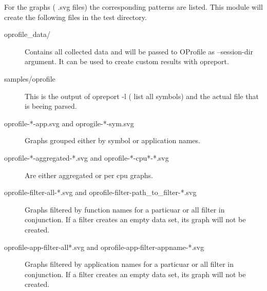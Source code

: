     For the graphs ( .svg files) the corresponding patterns are listed.
    This module will create the following files in the test directory.
    \begin{description}
        \item[oprofile\_data/]
            Contains all collected data and will be passed to OProfile
            as --session-dir argument. It can be used to create custom
            results with opreport.

        \item[samples/oprofile]
            This is the output of opreport -l ( list all symbols) and
            the actual file that is beeing parsed.

        \item[oprofile-*-app.svg and oprogile-*-sym.svg]
            Graphs grouped either by symbol or application names.

        \item[oprofile-*-aggregated-*.svg and oprofile-*-cpu*-*.svg]
            Are either aggregated or per cpu graphs.

        \item[oprofile-filter-all-*.svg and oprofile-filter-path\_to\_filter-*.svg]
            Graphs filtered by function names for a particuar or all filter in 
            conjunction.
            If a filter creates an empty data set, its graph will not be created.

        \item[oprofile-app-filter-all*.svg and oprofile-app-filter-appname-*.svg]
            Graphs filtered by application names for a particuar or all filter in 
            conjunction.
            If a filter creates an empty data set, its graph will not be created.
    \end{description}

